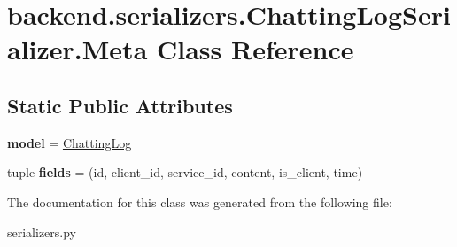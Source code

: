 \hypertarget{classbackend_1_1serializers_1_1_chatting_log_serializer_1_1_meta}{}\section{backend.\+serializers.\+Chatting\+Log\+Serializer.\+Meta Class Reference}
\label{classbackend_1_1serializers_1_1_chatting_log_serializer_1_1_meta}
\subsection*{Static Public Attributes}
\begin{DoxyCompactItemize}
\item 
\mbox{\label{classbackend_1_1serializers_1_1_chatting_log_serializer_1_1_meta_ad9ece68b9b4417b89153704421118635}} 
{\bfseries model} = \hyperlink{classbackend_1_1models_1_1_chatting_log}{Chatting\+Log}
\item 
\mbox{\label{classbackend_1_1serializers_1_1_chatting_log_serializer_1_1_meta_aa11cd94675f54272c4541b62bc715300}} 
tuple {\bfseries fields} = (\textquotesingle{}id\textquotesingle{}, \textquotesingle{}client\+\_\+id\textquotesingle{}, \textquotesingle{}service\+\_\+id\textquotesingle{}, \textquotesingle{}content\textquotesingle{}, \textquotesingle{}is\+\_\+client\textquotesingle{}, \textquotesingle{}time\textquotesingle{})
\end{DoxyCompactItemize}


The documentation for this class was generated from the following file\+:\begin{DoxyCompactItemize}
\item 
serializers.\+py\end{DoxyCompactItemize}
